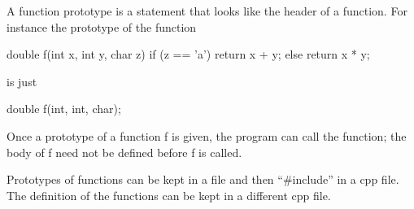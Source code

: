 \newpage{}

A function prototype is a statement that looks like the header of a
function. For instance the prototype of the function

\begin{consolethree}[escapeinside=||]
double f(int x, int y, char z)
{
    if (z == 'a')
    {
        return x + y;
    }
    else
    {
        return x * y;
    }
}
\end{consolethree}

is just

\begin{consolethree}[escapeinside=||]
double f(int, int, char);
\end{consolethree}

Once a prototype of a function f is given, the program can call the
function; the body of f need not be defined before f is called.

Prototypes of functions can be kept in a file and then ``\#include'' in
a cpp file. The definition of the functions can be kept in a different
cpp file.
